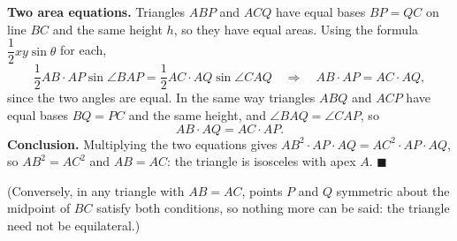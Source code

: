 \textbf{Two area equations.} Triangles $ABP$ and $ACQ$ have equal bases $BP=QC$ on line $BC$ and the same height $h$, so they have equal areas. Using the formula $\dfrac12xy\sin\theta$ for each,
\[\dfrac12AB\cdot AP\sin\angle BAP=\dfrac12AC\cdot AQ\sin\angle CAQ\quad\Longrightarrow\quad AB\cdot AP=AC\cdot AQ,\]
since the two angles are equal. In the same way triangles $ABQ$ and $ACP$ have equal bases $BQ=PC$ and the same height, and $\angle BAQ=\angle CAP$, so
\[AB\cdot AQ=AC\cdot AP.\]
\textbf{Conclusion.} Multiplying the two equations gives $AB^2\cdot AP\cdot AQ=AC^2\cdot AP\cdot AQ$, so $AB^2=AC^2$ and $\boxed{AB=AC}$: the triangle is isosceles with apex $A$. $\blacksquare$

(Conversely, in any triangle with $AB=AC$, points $P$ and $Q$ symmetric about the midpoint of $BC$ satisfy both conditions, so nothing more can be said: the triangle need not be equilateral.)
